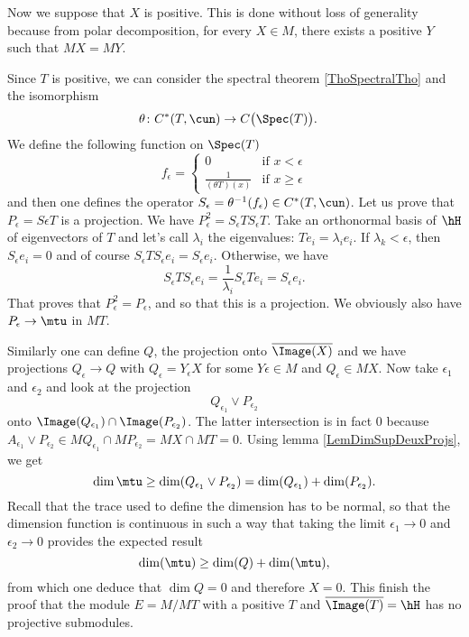 Now we suppose that $X$ is positive. This is done without loss of generality because from polar decomposition, for every $X\in M$, there exists a positive $Y$ such that $MX=MY$.

Since $T$ is positive, we can consider the spectral theorem \ref{ThoSpectralTho} and the isomorphism
\begin{equation}
\begin{aligned}
 \theta\colon C^*(T,\cun)&\to C\big( \Spec(T) \big). 
\end{aligned}
\end{equation}
We define the following function on $\Spec(T)$
\begin{equation}
	f_{\epsilon}=
			\begin{cases}
					0				&\text{if }x<\epsilon\\
					\frac{ 1 }{ (\theta T)(x) }	&\text{if }x\geq\epsilon
			\end{cases}
\end{equation}
and then one defines the operator $S_{\epsilon}=\theta^{-1}(f_{\epsilon})\in C^*(T,\cun)$. Let us prove that $P_{\epsilon}=S\epsilon T$ is a projection. We have $P_{\epsilon}^2=S_{\epsilon} TS_{\epsilon}T$. Take an orthonormal basis of $\hH$ of eigenvectors of $T$ and let's call $\lambda_i$ the eigenvalues: $Te_i=\lambda_ie_i$. If $\lambda_k<\epsilon$, then $S_{\epsilon}e_i=0$ and of course $S_{\epsilon}TS_{\epsilon}e_i=S_{\epsilon}e_i$. Otherwise, we have
\begin{equation}
	S_{\epsilon}TS_{\epsilon}e_i=\frac{1}{ \lambda_i }S_{\epsilon}T e_i =S_{\epsilon}e_i.
\end{equation}
That proves that $P_{\epsilon}^2=P_{\epsilon}$, and so that this is a projection. We obviously also have $P_{\epsilon}\to \mtu$ in $MT$.

Similarly one can define $Q$, the projection onto $\overline{ \Image(X) }$ and we have projections $Q_{\epsilon}\to Q$ with $Q_{\epsilon}=Y_{\epsilon} X$ for some $Y\epsilon\in M$ and $Q_{\epsilon}\in MX$. Now take $\epsilon_1$ and $\epsilon_2$ and look at the projection
\begin{equation}
	Q_{\epsilon_1}\vee P_{\epsilon_2}
\end{equation}
onto $\Image(Q_{\epsilon_1})\cap\Image(P_{\epsilon_2})$. The latter intersection is in fact $0$ because $A_{\epsilon_1}\vee P_{\epsilon_2}\in MQ_{\epsilon_1}\cap MP_{\epsilon_2}=MX\cap MT=0$. Using lemma \ref{LemDimSupDeuxProjs}, we get
\begin{equation}
	\dim\mtu\geq \dim(Q_{\epsilon_1}\vee P_{\epsilon_2})=\dim(Q_{\epsilon_1})+\dim(P_{\epsilon_2}).
\end{equation}
Recall that the trace used to define the dimension has to be normal, so that the dimension function is continuous in such a way that taking the limit $\epsilon_1\to 0$ and $\epsilon_2\to 0$ provides the expected result
\begin{equation}
	\dim(\mtu)\geq \dim(Q)+\dim(\mtu),
\end{equation}
from which one deduce that $\dim Q=0$ and therefore $X=0$. This finish the proof that the module $E=M/MT$ with a positive $T$ and $\overline{ \Image(T) }=\hH$ has no projective submodules.

